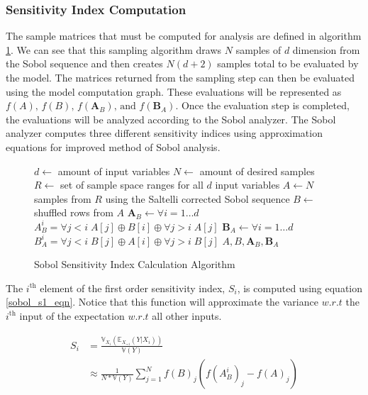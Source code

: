 \subsubsection{Sensitivity Index Computation\label{sec:si_comp}}
The sample matrices that must be computed for analysis are defined in algorithm \ref{sobol_sample_alg}. We can see that this sampling algorithm draws $N$ samples of $d$ dimension from the Sobol sequence and then creates $N(d+2)$ samples total to be evaluated by the model. The matrices returned from the sampling step can then be evaluated using the model computation graph. These evaluations will be represented as $f(A) \text{, } f(B) \text{, } f(\textbf{A}_{B}) \text{, and } f(\textbf{B}_{A})$. Once the evaluation step is completed, the evaluations will be analyzed according to the Sobol analyzer. The Sobol analyzer computes three different sensitivity indices using approximation equations for \citet{saltelli2010varianceSA} improved method of Sobol analysis.

\begin{figure}
  \label{sobol_sample_alg}
    \begin{algorithmic}[1]
      \State $d \gets $ amount of input variables
      \State $N \gets $ amount of desired samples
      \State $R \gets $ set of sample space ranges for all $d$ input variables
      \State $A \gets N$ samples from $R$ using the Saltelli corrected Sobol sequence
      \State $B \gets $ shuffled rows from $A$
      \State $\textbf{A}_{B} \gets \forall i = 1 \ldots d$ $A_{B}^i = \forall j < i \; A[j] \oplus B[i] \oplus \forall j > i \; A[j]$
      \State $\textbf{B}_{A} \gets \forall i = 1 \ldots d$ $B_{A}^i = \forall j < i \; B[j] \oplus A[i] \oplus \forall j > i \; B[j]$
      \State \Return $A, B, \textbf{A}_{B}, \textbf{B}_{A}$
    \end{algorithmic}
  \caption{Sobol Sensitivity Index Calculation Algorithm}
\end{figure}


The $i^{\text{th}}$ element of the first order sensitivity index, $S_i$, is computed using equation \ref{sobol_s1_eqn}. Notice that this function will approximate the variance $w.r.t$ the $i^{\text{th}}$ input of the expectation $w.r.t$ all other inputs.

\begin{equation} \label{sobol_s1_eqn}
  \begin{split}
    S_i & = \frac{\mathbb{V}_{X_i}\left(\mathbb{E}_{X_{\sim i}}(Y | X_i) \right)}{\mathbb{V}(Y)} \\
     & \approx \frac{1}{N * \mathbb{V}(Y)} \sum_{j=1}^{N} f(B)_j\left( f(A_{B}^{i})_j - f(A)_j\right)
  \end{split}
\end{equation}

